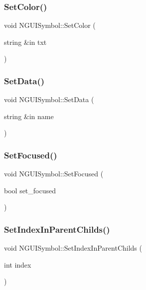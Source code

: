 \subsubsection{\texorpdfstring{Set\+Color()}{SetColor()}\hspace{0.1cm}{\footnotesize\ttfamily [2/2]}}
{\footnotesize\ttfamily void N\+G\+U\+I\+Symbol\+::\+Set\+Color (\begin{DoxyParamCaption}\item[{string \&in}]{txt }\end{DoxyParamCaption})}

\hypertarget{class_n_g_u_i_symbol_a0597ef7f9be738ac05c9f81f5ac2b09a}{}\label{class_n_g_u_i_symbol_a0597ef7f9be738ac05c9f81f5ac2b09a} 
\subsubsection{\texorpdfstring{Set\+Data()}{SetData()}}
{\footnotesize\ttfamily void N\+G\+U\+I\+Symbol\+::\+Set\+Data (\begin{DoxyParamCaption}\item[{string \&in}]{name }\end{DoxyParamCaption})}

\hypertarget{class_n_g_u_i_symbol_a8ab17d1ced7c98c2912792409a307b9e}{}\label{class_n_g_u_i_symbol_a8ab17d1ced7c98c2912792409a307b9e} 
\subsubsection{\texorpdfstring{Set\+Focused()}{SetFocused()}}
{\footnotesize\ttfamily void N\+G\+U\+I\+Symbol\+::\+Set\+Focused (\begin{DoxyParamCaption}\item[{bool}]{set\+\_\+focused }\end{DoxyParamCaption})}

\hypertarget{class_n_g_u_i_symbol_a29c2169202ca88f8c1fcfe45af9374ef}{}\label{class_n_g_u_i_symbol_a29c2169202ca88f8c1fcfe45af9374ef} 
\subsubsection{\texorpdfstring{Set\+Index\+In\+Parent\+Childs()}{SetIndexInParentChilds()}}
{\footnotesize\ttfamily void N\+G\+U\+I\+Symbol\+::\+Set\+Index\+In\+Parent\+Childs (\begin{DoxyParamCaption}\item[{int}]{index }\end{DoxyParamCaption})}


